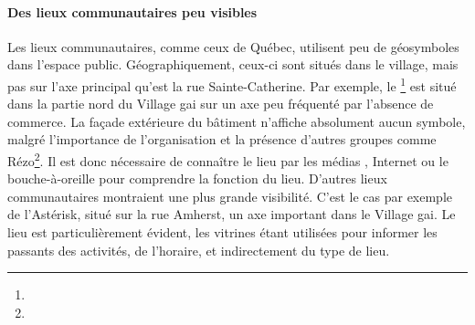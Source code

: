 \paragraph{Des lieux communautaires peu visibles}
Les lieux communautaires, comme ceux de Québec, utilisent peu de géosymboles dans l'espace public.
Géographiquement, ceux-ci sont situés dans le village, mais pas sur l'axe principal qu'est la rue Sainte-Catherine.
Par exemple, le \ccglm{}\footnote{}
est situé dans la partie nord du Village gai sur un axe peu fréquenté par l'absence de commerce.
La façade extérieure du bâtiment n'affiche absolument aucun symbole, malgré l'importance de l'organisation et la présence d'autres groupes \lgbt{} comme Rézo\footnote{}.
Il est donc nécessaire de connaître le lieu par les médias \lgbt{}, Internet ou le bouche-à-oreille pour comprendre la fonction du lieu.
D'autres lieux communautaires montraient une plus grande visibilité.
C'est le cas par exemple de l'Astérisk, situé sur la rue Amherst, un axe important dans le Village gai.
Le lieu est particulièrement évident, les vitrines étant utilisées pour informer les passants des activités, de l'horaire, et indirectement du type de lieu.

